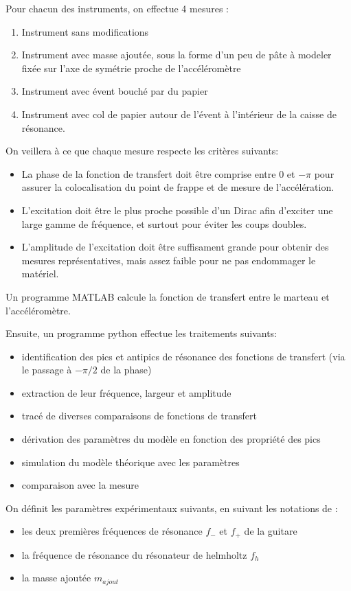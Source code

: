 \documentclass[atiam, article]{rapport} %
\begin{document}
Pour chacun des instruments, on effectue 4 mesures :
\begin{enumerate}
    \item Instrument sans modifications
    \item Instrument avec masse ajoutée, sous la forme d'un peu de pâte à modeler fixée sur l'axe de symétrie proche de l'accéléromètre
    \item Instrument avec évent bouché par du papier
    \item Instrument avec col de papier autour de l'évent à l'intérieur de la caisse de résonance.
\end{enumerate}

On veillera à ce que chaque mesure respecte les critères suivants:

\begin{itemize}
    \item La phase de la fonction de transfert doit être comprise entre $0$ et $-\pi$ pour assurer la colocalisation du point de frappe et de mesure de l'accélération.
    \item L'excitation doit être le plus proche possible d'un Dirac afin d'exciter une large gamme de fréquence, et surtout pour éviter les coups doubles.\item L'amplitude de l'excitation doit être suffisament grande pour obtenir des mesures représentatives, mais assez faible pour ne pas endommager le matériel.
\end{itemize}

Un programme MATLAB calcule la fonction de transfert entre le marteau et l'accéléromètre.

Ensuite, un programme python effectue les traitements suivants:
\begin{itemize}
    \item identification des pics et antipics de résonance des fonctions de transfert (via le passage à $-\pi/2$ de la phase)
    \item extraction de leur fréquence, largeur et amplitude
    \item tracé de diverses comparaisons de fonctions de transfert
    \item dérivation des paramètres du modèle en fonction des propriété des pics
    \item simulation du modèle théorique avec les paramètres
    \item comparaison avec la mesure
\end{itemize}

On définit les paramètres expérimentaux suivants, en suivant les notations de \cite{10.1121/1.384814}:
\begin{itemize}
    \item les deux premières fréquences de résonance $f_-$ et $f_+$ de la guitare
    \item la fréquence de résonance du résonateur de helmholtz $f_h$
    \item la masse ajoutée $m_{ajout}$
\end{itemize}
\end{document}
